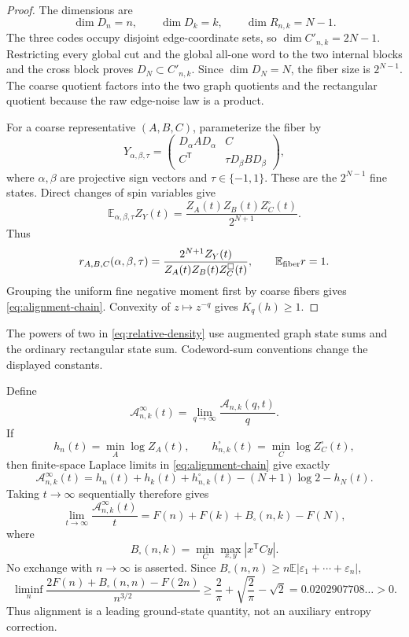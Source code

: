 \documentclass[11pt]{article}
\newcommand{\eps}{\{-1,1\}}
\newcommand{\E}{\mathbb E}
\begin{document}
\begin{proof}
The dimensions are
\[
 \dim D_n=n,\qquad \dim D_k=k,\qquad
 \dim R_{n,k}=N-1.
\]
The three codes occupy disjoint edge-coordinate sets, so
$\dim C'_{n,k}=2N-1$.  Restricting every global cut and the global all-one
word to the two internal blocks and the cross block proves
$D_N\subset C'_{n,k}$.  Since $\dim D_N=N$, the fiber size is $2^{N-1}$.
The coarse quotient factors into the two graph quotients and the rectangular
quotient because the raw edge-noise law is a product.

For a coarse representative $(A,B,C)$, parameterize the fiber by
\[
 Y_{\alpha,\beta,\tau}=
 \begin{pmatrix}
 D_\alpha AD_\alpha&C\\
 C^{\mathsf T}&\tau D_\beta BD_\beta
 \end{pmatrix},
\]
where $\alpha,\beta$ are projective sign vectors and $\tau\in\eps$.  These are
the $2^{N-1}$ fine states.  Direct changes of spin variables give
\[
 \E_{\alpha,\beta,\tau}Z_Y(t)
 =\frac{Z_A(t)Z_B(t)Z_C^\square(t)}{2^{N+1}}.
\]
Thus
\begin{equation}
 r_{A,B,C}(\alpha,\beta,\tau)
 =\frac{2^{N+1}Z_Y(t)}{Z_A(t)Z_B(t)Z_C^\square(t)},
 \qquad \E_{\rm fiber}r=1.
 \label{eq:relative-density}
\end{equation}
Grouping the uniform fine negative moment first by coarse fibers gives
\eqref{eq:alignment-chain}.  Convexity of $z\mapsto z^{-q}$ gives
$K_q(h)\ge1$.
\end{proof}

The powers of two in \eqref{eq:relative-density} use augmented graph state
sums and the ordinary rectangular state sum.  Codeword-sum conventions change
the displayed constants.

Define
\[
 \mathcal A_{n,k}^{\infty}(t)
 =\lim_{q\to\infty}\frac{\mathcal A_{n,k}(q,t)}q.
\]
If
\[
 h_n(t)=\min_A\log Z_A(t),\qquad
 h_{n,k}^{\square}(t)=\min_C\log Z_C^\square(t),
\]
then finite-space Laplace limits in \eqref{eq:alignment-chain} give exactly
\[
 \mathcal A_{n,k}^{\infty}(t)
 =h_n(t)+h_k(t)+h_{n,k}^{\square}(t)
 -(N+1)\log2-h_N(t).
\]
Taking $t\to\infty$ sequentially therefore gives
\begin{equation}
 \lim_{t\to\infty}\frac{\mathcal A_{n,k}^{\infty}(t)}t
 =F(n)+F(k)+B_\square(n,k)-F(N),
 \label{eq:alignment-slope}
\end{equation}
where
\[
 B_\square(n,k)=\min_C\max_{x,y}|x^{\mathsf T}Cy|.
\]
No exchange with $n\to\infty$ is asserted.  Since
$B_\square(n,n)\ge n\E|\varepsilon_1+\cdots+\varepsilon_n|$,
\begin{equation}
 \liminf_n\frac{2F(n)+B_\square(n,n)-F(2n)}{n^{3/2}}
 \ge\frac2\pi+\sqrt{\frac2\pi}-\sqrt2
 =0.0202907708\ldots>0.
 \label{eq:alignment-leading}
\end{equation}
Thus alignment is a leading ground-state quantity, not an auxiliary entropy
correction.
\end{document}

